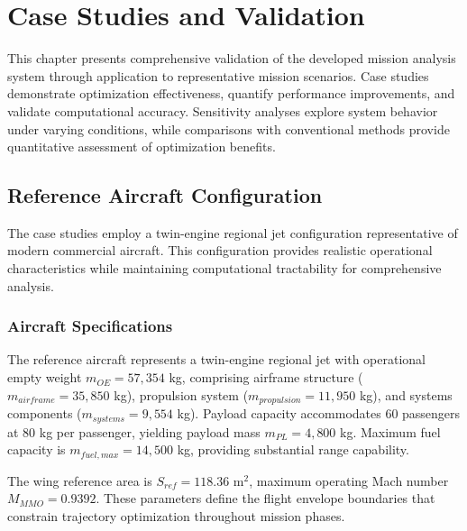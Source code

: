 \chapter{Case Studies and Validation}

This chapter presents comprehensive validation of the developed mission analysis system through application to representative mission scenarios. Case studies demonstrate optimization effectiveness, quantify performance improvements, and validate computational accuracy. Sensitivity analyses explore system behavior under varying conditions, while comparisons with conventional methods provide quantitative assessment of optimization benefits.

\section{Reference Aircraft Configuration}

The case studies employ a twin-engine regional jet configuration representative of modern commercial aircraft. This configuration provides realistic operational characteristics while maintaining computational tractability for comprehensive analysis.

\subsection{Aircraft Specifications}

The reference aircraft represents a twin-engine regional jet with operational empty weight $m_{OE} = 57,354$ kg, comprising airframe structure ($m_{airframe} = 35,850$ kg), propulsion system ($m_{propulsion} = 11,950$ kg), and systems components ($m_{systems} = 9,554$ kg). Payload capacity accommodates 60 passengers at 80 kg per passenger, yielding payload mass $m_{PL} = 4,800$ kg. Maximum fuel capacity is $m_{fuel,max} = 14,500$ kg, providing substantial range capability.

The wing reference area is $S_{ref} = 118.36$ m$^2$, maximum operating Mach number $M_{MMO} = 0.9392$. These parameters define the flight envelope boundaries that constrain trajectory optimization throughout mission phases.

